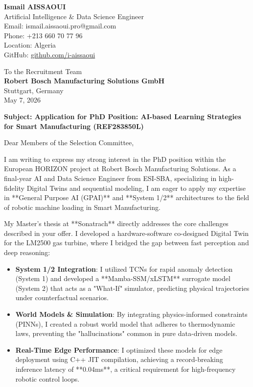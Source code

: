\documentclass[11pt,a4paper]{article}
\begin{document}
\noindent \textbf{Ismail AISSAOUI} \\
Artificial Intelligence \& Data Science Engineer \\
Email: ismail.aissaoui.pro@gmail.com \\
Phone: +213 660 70 77 96 \\
Location: Algeria \\
GitHub: \href{https://github.com/i-aissaoui}{github.com/i-aissaoui}

\bigskip

\begin{flushright}
    To the Recruitment Team \\
    \textbf{Robert Bosch Manufacturing Solutions GmbH} \\
    Stuttgart, Germany \\
    \medskip
    May 7, 2026
\end{flushright}

\bigskip

\noindent \textbf{Subject: Application for PhD Position: AI-based Learning Strategies for Smart Manufacturing (REF283850L)}

\bigskip

\noindent Dear Members of the Selection Committee,

\medskip

I am writing to express my strong interest in the PhD position within the European HORIZON project at Robert Bosch Manufacturing Solutions. As a final-year AI and Data Science Engineer from ESI-SBA, specializing in high-fidelity Digital Twins and sequential modeling, I am eager to apply my expertise in **General Purpose AI (GPAI)** and **System 1/2** architectures to the field of robotic machine loading in Smart Manufacturing.

My Master's thesis at **Sonatrach** directly addresses the core challenges described in your offer. I developed a hardware-software co-designed Digital Twin for the LM2500 gas turbine, where I bridged the gap between fast perception and deep reasoning:
\begin{itemize}
    \item \textbf{System 1/2 Integration}: I utilized TCNs for rapid anomaly detection (System 1) and developed a **Mamba-SSM/xLSTM** surrogate model (System 2) that acts as a "What-If" simulator, predicting physical trajectories under counterfactual scenarios.
    \item \textbf{World Models \& Simulation}: By integrating physics-informed constraints (PINNs), I created a robust world model that adheres to thermodynamic laws, preventing the "hallucinations" common in pure data-driven models.
    \item \textbf{Real-Time Edge Performance}: I optimized these models for edge deployment using C++ JIT compilation, achieving a record-breaking inference latency of **0.04ms**, a critical requirement for high-frequency robotic control loops.
\end{itemize}
\end{document}
